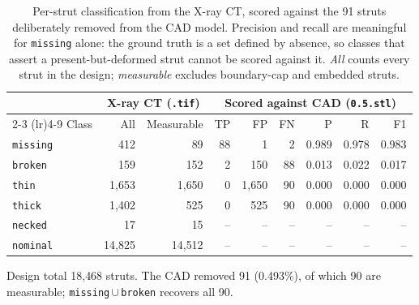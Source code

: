 %
\begin{table}[t]
  \centering
  \small
  \caption{Per-strut classification from the X-ray CT, scored against the
    91 struts deliberately removed from the CAD model. Precision and
    recall are meaningful for \texttt{missing} alone: the ground truth is a set defined by
    absence, so classes that assert a present-but-deformed strut cannot be scored against
    it. \emph{All} counts every strut in the design; \emph{measurable} excludes
    boundary-cap and embedded struts.}
  \label{tab:perstrut}
  \begin{tabular}{l rr rrr rrr}
    \toprule
    & \multicolumn{2}{c}{X-ray CT (\texttt{.tif})}
    & \multicolumn{6}{c}{Scored against CAD (\texttt{0.5.stl})} \\
    \cmidrule(lr){2-3} \cmidrule(lr){4-9}
    Class & All & Measurable & TP & FP & FN & P & R & F1 \\
    \midrule
  \texttt{missing} & 412 & 89 & 88 & 1 & 2 & 0.989 & 0.978 & 0.983 \\
  \texttt{broken} & 159 & 152 & 2 & 150 & 88 & 0.013 & 0.022 & 0.017 \\
  \texttt{thin} & 1{,}653 & 1{,}650 & 0 & 1{,}650 & 90 & 0.000 & 0.000 & 0.000 \\
  \texttt{thick} & 1{,}402 & 525 & 0 & 525 & 90 & 0.000 & 0.000 & 0.000 \\
  \texttt{necked} & 17 & 15 & -- & -- & -- & -- & -- & -- \\
  \midrule
  \texttt{nominal} & 14{,}825 & 14{,}512 & -- & -- & -- & -- & -- & -- \\
    \bottomrule
  \end{tabular}

  \vspace{2pt}
  \footnotesize
  Design total 18{,}468 struts. The CAD removed 91
  (0.493\%), of which 90 are measurable;
  \texttt{missing}\,$\cup$\,\texttt{broken} recovers all 90.
\end{table}
